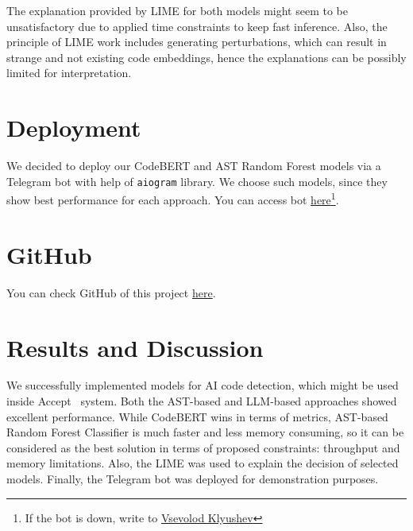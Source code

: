 \documentclass{article}
\begin{document}
The explanation provided by LIME for both models might seem to be unsatisfactory due to applied time constraints to keep fast inference. Also, the principle of LIME work includes generating perturbations, which can result in strange and not existing code embeddings, hence the explanations can be possibly limited for interpretation.

\section{Deployment}

We decided to deploy our CodeBERT and AST Random Forest models via a Telegram bot with help of \texttt{aiogram} library. We choose such models, since they show best performance for each approach. You can access bot \href{https://t.me/ui_ai_detector_bot}{here}\footnote{If the bot is down, write to \href{https://t.me/Kiaver}{Vsevolod Klyushev}}.

\section{GitHub}

You can check GitHub of this project \href{https://github.com/dsomni/ml-s25}{here}.

\section{Results and Discussion}

We successfully implemented models for AI code detection, which might be used inside Accept~\cite{Beresnev} system. Both the AST-based and LLM-based approaches showed excellent performance. While CodeBERT wins in terms of metrics, AST-based Random Forest Classifier is much faster and less memory consuming, so it can be considered as the best solution in terms of proposed constraints: throughput and memory limitations. Also, the LIME was used to explain the decision of selected models. Finally, the Telegram bot was deployed for demonstration purposes.



\end{document}

